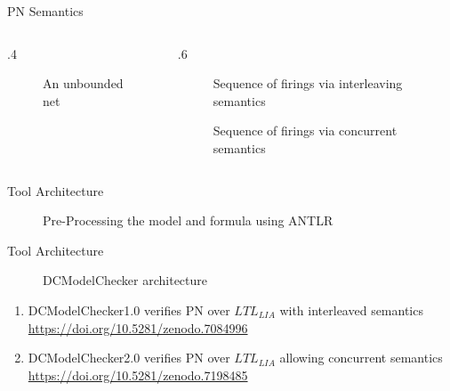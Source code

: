 \documentclass [serif,professionalfont]{beamer}
\newcommand{\LC}{$LTL_{LIA}$}
\begin{document}
\begin{frame}{PN Semantics}

    \begin{columns}[T] %
        \begin{column}{.4\textwidth}
            \begin{figure}
                \centering

                \scalebox{0.5}{}

                \caption{An unbounded net}
                \label{fig:unboundednet}
            \end{figure}
        \end{column}
        \hfill
        \begin{column}{.6\textwidth}
            \begin{figure}
                \centering
                \scalebox{0.7}{}

                \caption{Sequence of firings via interleaving semantics}
                \label{fig:interleaveseq}
            \end{figure}

            \begin{figure}
                \centering
                \scalebox{0.7}{}

                \caption{Sequence of firings via concurrent semantics}
                \label{fig:concurseq}
            \end{figure}
        \end{column}%
    \end{columns}

\end{frame}

\begin{frame}{Tool Architecture}
    \begin{figure}[!ht]
        \centering
        \scalebox{0.5}{}
        \caption{Pre-Processing the model and formula using ANTLR}
        \label{ANTLRflow}

    \end{figure}
\end{frame}

\begin{frame}{Tool Architecture}
    \begin{figure}[!ht]
        \centering
        \scalebox{0.5}{}
        \caption{DCModelChecker  architecture}

    \end{figure}
    \begin{enumerate}
        \item DCModelChecker1.0 verifies PN over {\LC} with interleaved semantics \url{https://doi.org/10.5281/zenodo.7084996}
        \item DCModelChecker2.0 verifies PN over {\LC} allowing concurrent semantics \url{https://doi.org/10.5281/zenodo.7198485}
    \end{enumerate}
\end{frame}
\end{document}
